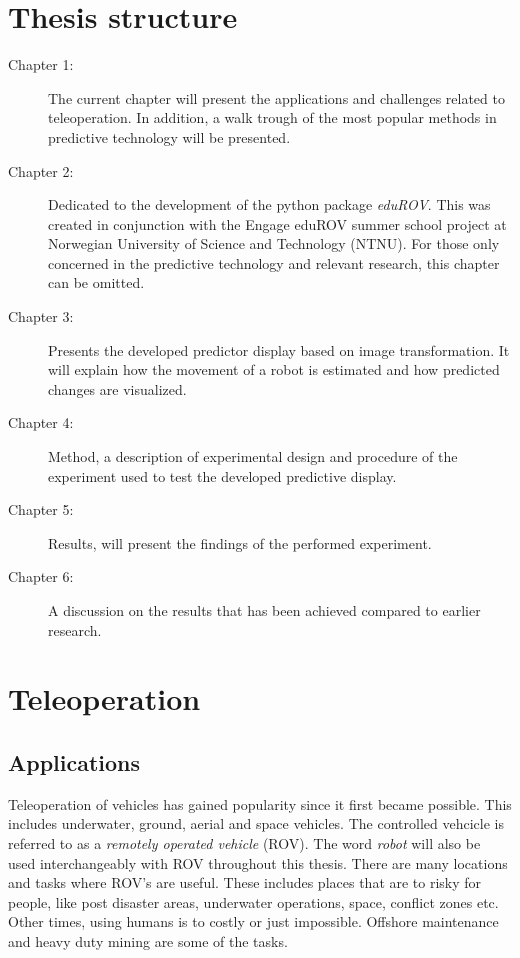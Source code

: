 \section{Thesis structure}

\begin{description}
\item [Chapter 1:] The current chapter will present the applications and challenges related to teleoperation. In addition, a walk trough of the most popular methods in predictive technology will be presented.

\item [Chapter 2:] Dedicated to the development of the python package \textit{eduROV}. This was created in conjunction with the Engage eduROV summer school project at Norwegian University of Science and Technology (NTNU). For those only concerned in the predictive technology and relevant research, this chapter can be omitted.

\item [Chapter 3:] Presents the developed predictor display based on image transformation. It will explain how the movement of a robot is estimated and how predicted changes are visualized.

\item [Chapter 4:] Method, a description of experimental design and procedure of the experiment used to test the developed predictive display.

\item [Chapter 5:] Results, will present the findings of the performed experiment.

\item [Chapter 6:] A discussion on the results that has been achieved compared to earlier research.
\end{description}

\section{Teleoperation}


\subsection{Applications}
Teleoperation of vehicles has gained popularity since it first became possible. This includes underwater, ground, aerial and space vehicles. The controlled vehcicle is referred to as a \emph{remotely operated vehicle} (ROV). The word \emph{robot} will also be used interchangeably with ROV throughout this thesis. There are many locations and tasks where ROV's are useful. These includes places that are to risky for people, like post disaster areas, underwater operations, space, conflict zones etc. Other times, using humans is to costly or just impossible. Offshore maintenance and heavy duty mining are some of the tasks. 

